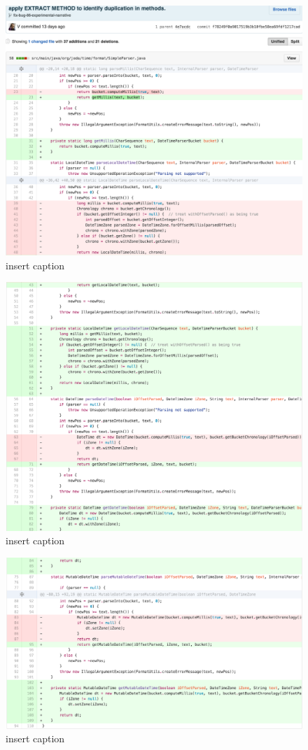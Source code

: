 \begin{figure}[H]
	\centering
	\includegraphics[width=\linewidth]{code85}
	\caption{insert caption}
\end{figure}
\begin{figure}[H]
	\centering
	\includegraphics[width=\linewidth]{code86}
	\caption{insert caption}
\end{figure}
\begin{figure}[H]
	\centering
	\includegraphics[width=\linewidth]{code87}
	\caption{insert caption}
\end{figure}
